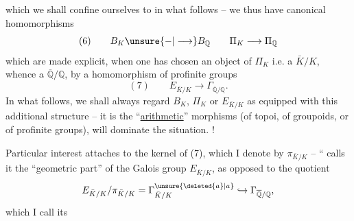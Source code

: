 which we shall confine ourselves to in what follows -- we thus have canonical homomorphisms
\[
(6)\qquad B_K\unsure{-|\longrightarrow}B_{\mathbb Q}\qquad\Pi_K\longrightarrow\Pi_{\mathbb Q}
\]
which are made explicit, when one has chosen an object of $\Pi_K$ i.e. a $\bar K/K$, whence a $\overline{\mathbb Q}/\mathbb Q$, by a homomorphism of profinite groups
\[
(7)\qquad E_{\bar K/K}\longrightarrow\Gamma_{\overline{\mathbb Q}/\mathbb Q}.
\]
In what follows, we shall always regard $B_K$, $\Pi_K$ or $E_{\bar K/K}$ as equipped with this additional structure -- it is the ``\uline{arithmetic}'' morphisms (of topoi, of groupoids, or of profinite groups), will dominate the situation. !

Particular interest attaches to the kernel of (7), which I denote by $\pi_{\bar K/K}$ -- `` calls it the ``geometric part'' of the Galois group $E_{\bar K/K}$, as opposed to the quotient
\[
E_{\bar K/K}/\pi_{\bar K/K}=\Gamma^{\unsure{\deleted{a}|a}}_{\bar K/K}\hookrightarrow\Gamma_{\overline{\mathbb Q}/\mathbb Q},
\]
which I call its
